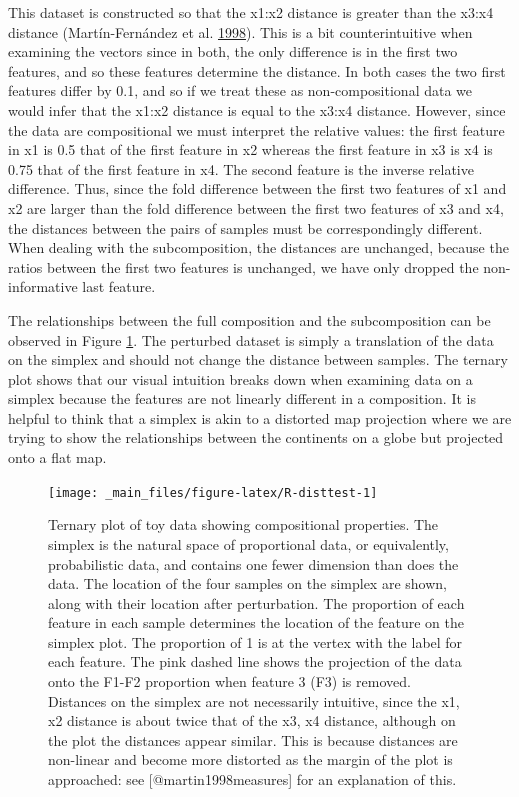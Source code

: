 \documentclass[onecolumn]{book}
\theoremstyle{definition}
\theoremstyle{definition}
\theoremstyle{definition}
\theoremstyle{remark}
\begin{document}
This dataset is constructed so that the x1:x2 distance is greater than
the x3:x4 distance (Martín-Fernández et al.
\protect\hyperlink{ref-martin1998measures}{1998}). This is a bit
counterintuitive when examining the vectors since in both, the only
difference is in the first two features, and so these features determine
the distance. In both cases the two first features differ by 0.1, and so
if we treat these as non-compositional data we would infer that the
x1:x2 distance is equal to the x3:x4 distance. However, since the data
are compositional we must interpret the relative values: the first
feature in x1 is 0.5 that of the first feature in x2 whereas the first
feature in x3 is x4 is 0.75 that of the first feature in x4. The second
feature is the inverse relative difference. Thus, since the fold
difference between the first two features of x1 and x2 are larger than
the fold difference between the first two features of x3 and x4, the
distances between the pairs of samples must be correspondingly
different. When dealing with the subcomposition, the distances are
unchanged, because the ratios between the first two features is
unchanged, we have only dropped the non-informative last feature.

The relationships between the full composition and the subcomposition
can be observed in Figure \ref{fig:R-disttest}. The perturbed dataset is
simply a translation of the data on the simplex and should not change
the distance between samples. The ternary plot shows that our visual
intuition breaks down when examining data on a simplex because the
features are not linearly different in a composition. It is helpful to
think that a simplex is akin to a distorted map projection where we are
trying to show the relationships between the continents on a globe but
projected onto a flat map.

\begin{figure}

{\centering \texttt{[image: \_main\_files/figure-latex/R-disttest-1]} 

}

\caption{Ternary plot of toy data showing compositional properties. The simplex is the natural space of proportional data, or equivalently, probabilistic data, and contains one fewer dimension than does the data. The location of the four samples on the simplex are shown, along with their location after perturbation. The proportion of each feature in each sample determines the location of the feature on the simplex plot. The proportion of 1 is at the vertex with the label for each feature. The pink dashed line shows the projection of the data onto the F1-F2 proportion when feature 3 (F3) is removed. Distances on the simplex are not necessarily intuitive, since the x1, x2 distance is about twice that of the x3, x4 distance, although on the plot the distances appear similar. This is because distances are non-linear and become more distorted as the margin of the plot is approached: see [@martin1998measures] for an explanation of this.}\label{fig:R-disttest}
\end{figure}
\end{document}

